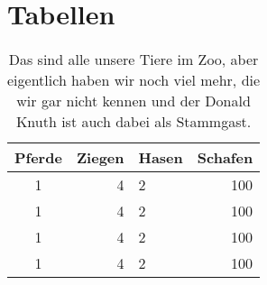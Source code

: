 \section{Tabellen}
\blindtext

\begin{table}[t!] 
    \begin{center}
        \label{tab:zoo}
        \begin{tabular}{c|r|l|r}
            Pferde & Ziegen & Hasen & Schafen \\\hline\hline
            1 & 4 & 2 & 100 \\
            1 & 4 & 2 & 100 \\
            1 & 4 & 2 & 100 \\
            1 & 4 & 2 & 100 \\\hline
        \end{tabular}
    \caption[Tiere im Zoo. So.]{Das sind alle unsere Tiere im Zoo, aber eigentlich haben wir noch viel mehr, die wir gar nicht kennen und der Donald Knuth ist auch dabei als Stammgast.}
    \end{center}
\end{table}

\blindtext
\clearpage
\listoftables

